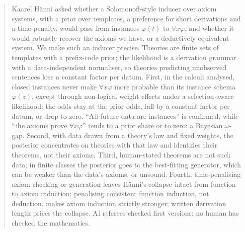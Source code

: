 \begin{abstract}
Kaarel H\"anni asked whether a Solomonoff-style inducer over axiom systems, with a prior over templates, a preference for short derivations and a time penalty, would pass from instances $\varphi(t)$ to $\forall x\varphi$, and whether it would robustly recover the axioms we have, or a deductively equivalent system. We make such an inducer precise. Theories are finite sets of templates with a prefix-code prior; the likelihood is a derivation grammar with a data-independent normaliser, so theories predicting unobserved sentences lose a constant factor per datum. First, in the calculi analysed, closed instances never make $\forall x\varphi$ more probable than its instance schema $\varphi(z)$, except through non-logical weight effects under a selection-aware likelihood: the odds stay at the prior odds, fall by a constant factor per datum, or drop to zero. ``All future data are instances'' is confirmed, while ``the axioms prove $\forall x\varphi$'' tends to a prior share or to zero: a Bayesian $\omega$-gap. Second, with data drawn from a theory's law and fixed weights, the posterior concentrates on theories with that law and identifies their theorems, not their axioms. Third, human-stated theorems are not such data; in finite classes the posterior goes to the best-fitting generator, which can be weaker than the data's axioms, or unsound. Fourth, time-penalising axiom checking or generation leaves H\"anni's collapse intact from function to axiom induction; penalising consistent function induction, not deduction, makes axiom induction strictly stronger; written derivation length prices the collapse. AI referees checked first versions; no human has checked the mathematics.
\end{abstract}

